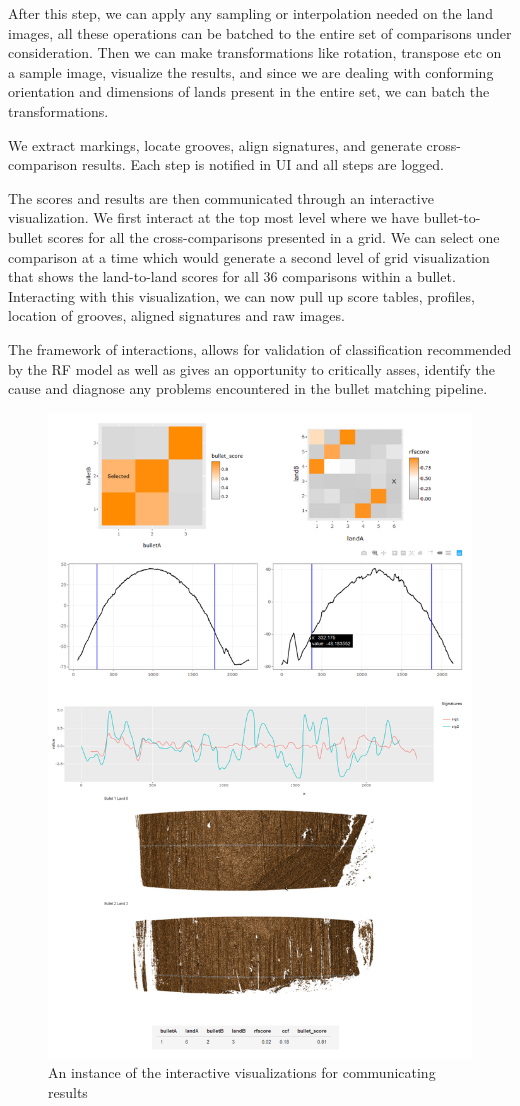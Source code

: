 \documentclass[]{book}
\begin{document}
After this step, we can apply any sampling or interpolation needed on the land images, all these operations can be batched to the entire set of comparisons under consideration. Then we can make transformations like rotation, transpose etc on a sample image, visualize the results, and since we are dealing with conforming orientation and dimensions of lands present in the entire set, we can batch the transformations.

We extract markings, locate grooves, align signatures, and generate cross-comparison results. Each step is notified in UI and all steps are logged.

The scores and results are then communicated through an interactive visualization. We first interact at the top most level where we have bullet-to-bullet scores for all the cross-comparisons presented in a grid. We can select one comparison at a time which would generate a second level of grid visualization that shows the land-to-land scores for all 36 comparisons within a bullet. Interacting with this visualization, we can now pull up score tables, profiles, location of grooves, aligned signatures and raw images.

The framework of interactions, allows for validation of classification recommended by the RF model as well as gives an opportunity to critically asses, identify the cause and diagnose any problems encountered in the bullet matching pipeline.

\begin{figure}

{\centering \includegraphics[width=0.5\linewidth]{images/bullets/gan-app2_consolidated} 

}

\caption{An instance of the interactive visualizations for communicating results}\label{fig:unnamed-chunk-19}
\end{figure}
\end{document}

